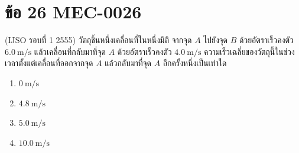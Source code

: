 \section*{ข้อ 26 \hfill \normalsize MEC-0026}
(IJSO รอบที่ 1 2555) วัตถุชิ้นหนึ่งเคลื่อนที่ในหนึ่งมิติ จากจุด $A$ ไปยังจุด $B$ ด้วยอัตราเร็วคงตัว $6.0\ \mathrm{m/s}$ แล้วเคลื่อนที่กลับมาที่จุด $A$ ด้วยอัตราเร็วคงตัว $4.0\ \mathrm{m/s}$ ความเร็วเฉลี่ยของวัตถุนี้ในช่วงเวลาตั้งแต่เคลื่อนที่ออกจากจุด $A$ แล้วกลับมาที่จุด $A$ อีกครั้งหนึ่งเป็นเท่าใด
\begin{enumerate}[label=\arabic*.,itemsep=0pt]\item $0\ \mathrm{m/s}$\item $4.8\ \mathrm{m/s}$\item $5.0\ \mathrm{m/s}$\item $10.0\ \mathrm{m/s}$\end{enumerate}
\medskip
